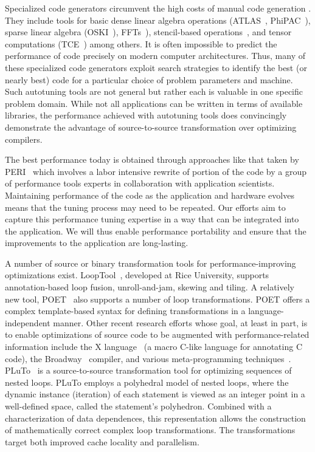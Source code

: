 \documentclass[runningheads]{llncs}
\begin{document}
Specialized code generators circumvent the high costs of manual code generation . They include tools for basic dense linear algebra operations (ATLAS~\cite{WN147}, PhiPAC~\cite{bilmes97optimizing,phipacwww}), sparse linear algebra (OSKI~\cite{vuduc05}), FFTs~\cite{FFTW,Spiral}), stencil-based operations~\cite{kamil06}, and tensor computations (TCE~\cite{TCE}) among others.  It is often impossible to predict the performance of code precisely on modern computer architectures. Thus, many of these specialized code generators exploit search strategies to identify the best (or nearly best) code for a particular choice of problem parameters and machine. Such autotuning tools are not general but rather each is valuable in one specific problem domain. While not all applications can be written in terms of available libraries, the performance achieved with autotuning tools does convincingly demonstrate the advantage of source-to-source transformation over optimizing compilers.

The best performance today is obtained through approaches like that taken by PERI~\cite{PERI} which involves a labor intensive rewrite of portion of the code by a group of performance tools experts in collaboration with application scientists. Maintaining performance of the code as the application and hardware evolves means that the tuning process may need to be repeated. Our efforts aim to capture this performance tuning expertise in a way that can be integrated into the application. We will thus enable performance portability and ensure that the improvements to the application are long-lasting.

A number of source or binary transformation tools for performance-improving optimizations exist. LoopTool~\cite{LoopTool}, developed at Rice University, supports annotation-based loop fusion, unroll-and-jam, skewing and tiling.  A relatively new tool, POET~\cite{POET} also supports a number of loop transformations. POET offers a complex template-based syntax for defining transformations in a language-independent manner. Other recent research efforts whose goal, at least in part, is to enable optimizations of source code to be augmented with performance-related information include the X language~\cite{XLanguage} (a macro C-like language for annotating C code), the Broadway~\cite{broadway} compiler, and various meta-programming techniques~\cite{veldhuizen95,weise93,kiczales91,chiba95}. PLuTo~\cite{Pluto,uday08cc} is a source-to-source transformation tool for optimizing sequences of nested loops. PLuTo employs a polyhedral model of nested loops, where the dynamic instance (iteration) of each statement is viewed as an integer point in a well-defined space, called the statement's polyhedron. Combined with a characterization of data dependences, this representation allows the construction of mathematically correct complex loop transformations. The transformations target both improved cache locality and parallelism.
\end{document}
